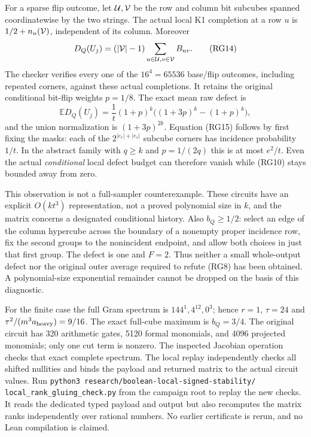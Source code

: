 \documentclass[11pt]{article}
\newcommand{\E}{\mathbb E}
\begin{document}
For a sparse flip outcome, let ${\cal U},{\cal V}$ be the row and
column bit subcubes spanned coordinatewise by the two strings.
The actual local K1 completion at a row $u$ is
$1/2+n_u({\cal V})$, independent of its column. Moreover
\[
 D_Q(U_j)=(|{\cal V}|-1)
           \sum_{u\in{\cal U},v\in{\cal V}}B_{uv}.       \tag{RG14}
\]
The checker verifies every one of the $16^4=65536$ base/flip outcomes,
including repeated corners, against these actual completions.
It retains the original conditional bit-flip weights $p=1/8$.
The exact mean raw defect is
\[
 \E D_Q(U_j)=\frac1t(1+p)^k
                    \bigl((1+3p)^k-(1+p)^k\bigr),      \tag{RG15}
\]
and the union normalization is $(1+3p)^{2k}$.
Equation (RG15) follows by first fixing the masks: each of the
$2^{|e_r|+|e_c|}$ subcube corners has incidence probability $1/t$.
In the abstract family with $q\ge k$ and $p=1/(2q)$ this is at most
$e^2/t$. Even the actual \emph{conditional} local defect budget can
therefore vanish while (RG10) stays bounded away from zero.

This observation is not a full-sampler counterexample. These circuits
have an explicit $O(kt^3)$ representation, not a proved polynomial
size in $k$, and the matrix concerns a designated conditional history.
Also $b_Q\ge1/2$: select an edge of the column hypercube across the
boundary of a nonempty proper incidence row, fix the second groups to
the nonincident endpoint, and allow both choices in just that first
group. The defect is one and $F=2$. Thus neither a small whole-output
defect nor the original outer average required to refute (RG8)
has been obtained. A polynomial-size exponential remainder cannot
be dropped on the basis of this diagnostic.

For the finite case the full Gram spectrum is
$144^1,4^{12},0^3$; hence $r=1$, $\tau=24$ and
$\tau^2/(m^3a_{\rm heavy})=9/16$.
The exact full-cube maximum is $b_Q=3/4$.
The original circuit has 320 arithmetic gates, 5120 formal monomials,
and 4096 projected monomials; only one cut term is nonzero.
The inspected Jacobian operation checks that exact complete spectrum.
The local replay independently checks all shifted nullities and binds
the payload and returned matrix to the actual circuit values.
Run \texttt{python3 research/boolean-local-signed-stability/%
local\_rank\_gluing\_check.py} from the campaign root to replay the new
checks. It reads the dedicated typed payload and output but also
recomputes the matrix ranks independently over rational numbers.
No earlier certificate is rerun, and no Lean compilation is claimed.
\end{document}
